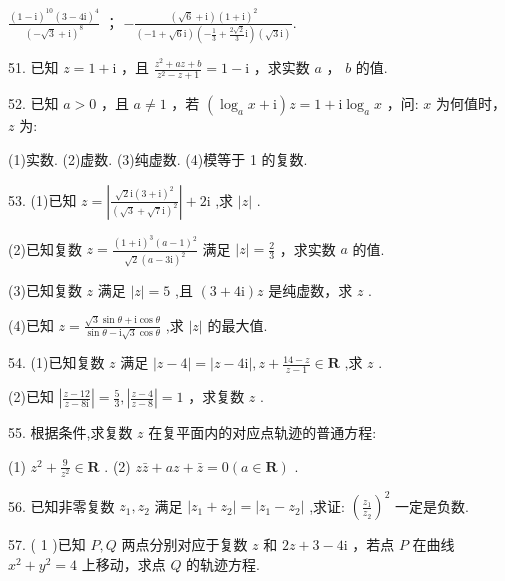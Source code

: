 \documentclass[10pt]{article}
\newcommand*\circled[1]{\tikz[baseline=(char.base)]{\node[shape=circle,draw,inner sep=1.5pt] (char) {\small #1};}}
\begin{document}
 \circled{5}  \(\frac{{\left( 1 - \mathrm{i}\right) }^{10}{\left( 3 - 4\mathrm{i}\right) }^{4}}{{\left( -\sqrt{3} + \mathrm{i}\right) }^{8}}\) ； \(- \frac{\left( {\sqrt{6} + \mathrm{i}}\right) {\left( 1 + \mathrm{i}\right) }^{2}}{\left( {-1 + \sqrt{6}\mathrm{i}}\right) \left( {-\frac{1}{3} + \frac{2\sqrt{2}}{3}\mathrm{i}}\right) \left( {\sqrt{3}\mathrm{i}}\right) }.\)

51. 已知 \(z = 1 + \mathrm{i}\) ，且 \(\frac{{z}^{2} + {az} + b}{{z}^{2} - z + 1} = 1 - \mathrm{i}\) ，求实数 \(a\) ， \(b\) 的值.

52. 已知 \(a > 0\) ，且 \(a \neq  1\) ，若 \(\left( {{\log }_{a}x + \mathrm{i}}\right) z = 1 + \mathrm{i}{\log }_{a}x\) ，问: \(x\) 为何值时， \(z\) 为:

(1)实数. (2)虚数. (3)纯虚数. (4)模等于 1 的复数.

53. (1)已知 \(z = \left| \frac{\sqrt{2}\mathrm{i}{\left( 3 + \mathrm{i}\right) }^{2}}{{\left( \sqrt{3} + \sqrt{7}\mathrm{i}\right) }^{2}}\right|  + 2\mathrm{i}\) ,求 \(\left| z\right|\) .

(2)已知复数 \(z = \frac{{\left( 1 + \mathrm{i}\right) }^{3}{\left( a - 1\right) }^{2}}{\sqrt{2}{\left( a - 3\mathrm{i}\right) }^{2}}\) 满足 \(\left| z\right|  = \frac{2}{3}\) ，求实数 \(a\) 的值.

(3)已知复数 \(z\) 满足 \(\left| z\right|  = 5\) ,且 \(\left( {3 + 4\mathrm{i}}\right) z\) 是纯虚数，求 \(z\) .

(4)已知 \(z = \frac{\sqrt{3}\sin \theta  + \mathrm{i}\cos \theta }{\sin \theta  - \mathrm{i}\sqrt{3}\cos \theta }\) ,求 \(\left| z\right|\) 的最大值.

54. (1)已知复数 \(z\) 满足 \(\left| {z - 4}\right|  = \left| {z - 4\mathrm{i}}\right| ,z + \frac{{14} - z}{z - 1} \in  \mathbf{R}\) ,求 \(z\) .

(2)已知 \(\left| \frac{z - {12}}{z - 8\mathrm{i}}\right|  = \frac{5}{3},\left| \frac{z - 4}{z - 8}\right|  = 1\) ，求复数 \(z\) .

55. 根据条件,求复数 \(z\) 在复平面内的对应点轨迹的普通方程:

(1) \({z}^{2} + \frac{9}{{z}^{2}} \in  \mathbf{R}\) . (2) \(z\bar{z} + {az} + \bar{z} = 0\left( {a \in  \mathbf{R}}\right)\) .

56. 已知非零复数 \({z}_{1},{z}_{2}\) 满足 \(\left| {{z}_{1} + {z}_{2}}\right|  = \left| {{z}_{1} - {z}_{2}}\right|\) ,求证: \({\left( \frac{{z}_{1}}{{z}_{2}}\right) }^{2}\) 一定是负数.

57. ( 1 )已知 \(P,Q\) 两点分别对应于复数 \(z\) 和 \({2z} + 3 - 4\mathrm{i}\) ，若点 \(P\) 在曲线 \({x}^{2} + {y}^{2} = 4\) 上移动，求点 \(Q\) 的轨迹方程.
\end{document}
